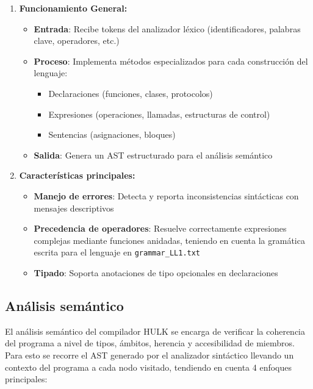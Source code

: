 \documentclass{article}
\begin{document}
\begin{enumerate}
  \item \textbf{Funcionamiento General:}
  \begin{itemize}
    \item \textbf{Entrada}: Recibe tokens del analizador léxico (identificadores, palabras clave, operadores, etc.)
    
    \item \textbf{Proceso}: Implementa métodos especializados para cada construcción del lenguaje:
    \begin{itemize}
        \item Declaraciones (funciones, clases, protocolos)
        \item Expresiones (operaciones, llamadas, estructuras de control)
        \item Sentencias (asignaciones, bloques)
    \end{itemize}
    
    \item \textbf{Salida}: Genera un AST estructurado para el análisis semántico
  \end{itemize}
  \item \textbf{Características principales:}
  \begin{itemize}
      \item \textbf{Manejo de errores}: Detecta y reporta inconsistencias sintácticas con mensajes descriptivos
      \item \textbf{Precedencia de operadores}: Resuelve correctamente expresiones complejas mediante funciones anidadas, teniendo en cuenta la gramática escrita para el lenguaje en \texttt{grammar\_LL1.txt}
      \item \textbf{Tipado}: Soporta anotaciones de tipo opcionales en declaraciones
  \end{itemize}
\end{enumerate}

\subsection{Análisis semántico}

El análisis semántico del compilador HULK se encarga de verificar la coherencia del programa a nivel de tipos, ámbitos, herencia y accesibilidad de miembros.
Para esto se recorre el AST generado por el analizador sintáctico llevando un contexto del programa a cada nodo visitado, tendiendo en cuenta 4 enfoques principales:
\end{document}

